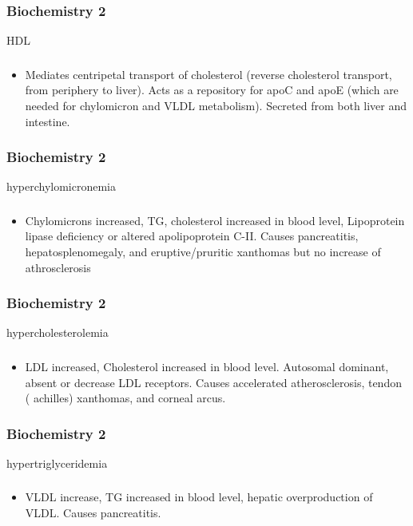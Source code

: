 \documentclass[11pt]{beamer}
\begin{document}
\begin{frame}
 \frametitle{Biochemistry 2}
HDL
\end{frame}

\begin{frame}
 \frametitle{}
\begin{itemize}
\item Mediates centripetal transport of cholesterol (reverse cholesterol transport, from periphery to liver). Acts as a repository for apoC and apoE (which are needed for chylomicron and VLDL metabolism). Secreted from both liver and intestine.
\end{itemize}
\end{frame}

\begin{frame}
 \frametitle{Biochemistry 2}
hyperchylomicronemia
\end{frame}

\begin{frame}
 \frametitle{}
\begin{itemize}
\item Chylomicrons increased, TG, cholesterol increased in blood level, Lipoprotein lipase deficiency or altered apolipoprotein C-II. Causes pancreatitis, hepatosplenomegaly, and eruptive/pruritic xanthomas but no increase of athrosclerosis 
\end{itemize}
\end{frame}

\begin{frame}
 \frametitle{Biochemistry 2}
hypercholesterolemia
\end{frame}

\begin{frame}
 \frametitle{}
\begin{itemize}
\item LDL increased, Cholesterol increased in blood level. Autosomal dominant, absent or decrease LDL receptors. Causes accelerated atherosclerosis, tendon ( achilles) xanthomas, and corneal arcus.  
\end{itemize}
\end{frame}

\begin{frame}
 \frametitle{Biochemistry 2}
hypertriglyceridemia
\end{frame}

\begin{frame}
 \frametitle{}
\begin{itemize}
\item VLDL increase, TG increased in blood level, hepatic overproduction of VLDL. Causes pancreatitis. 
\end{itemize}
\end{frame}
\end{document}
